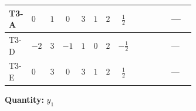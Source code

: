 \documentclass[8pt]{article}
\begin{document}
\begin{landscape}
\begin{longtable}{@{}llcccccc >{\raggedright\arraybackslash}p{0.21\linewidth} >{\raggedright\arraybackslash}p{0.21\linewidth} >{\raggedright\arraybackslash}p{0.21\linewidth}@{}}
\midrule
T3-A & $0$ & $1$ & $0$ & $3$ & $1$ & $2$ & $\frac{1}{2}$ & \scriptsize\adjustbox{max width=\linewidth}{$\begin{gathered} -\frac{9}{2} {g_2}^2 \left({y_1}\right)_{ij}\end{gathered}$} & \scriptsize\adjustbox{max width=\linewidth}{$\begin{gathered} -\frac{3}{2} {g_1}^2 \left({y_1}\right)_{ij}\end{gathered}$} & --- \\
\midrule
T3-D & $-2$ & $3$ & $-1$ & $1$ & $0$ & $2$ & $-\frac{1}{2}$ & \scriptsize\adjustbox{max width=\linewidth}{$\begin{gathered} -\frac{9}{2} {g_2}^2 \left({y_1}\right)_{ij}\end{gathered}$} & \scriptsize\adjustbox{max width=\linewidth}{$\begin{gathered} -\frac{3}{2} {g_1}^2 \left({y_1}\right)_{ij}\end{gathered}$} & --- \\
\midrule
T3-E & $0$ & $3$ & $0$ & $3$ & $1$ & $2$ & $\frac{1}{2}$ & \scriptsize\adjustbox{max width=\linewidth}{$\begin{gathered} -\frac{9}{2} {g_2}^2 \left({y_1}\right)_{ij}\end{gathered}$} & \scriptsize\adjustbox{max width=\linewidth}{$\begin{gathered} -\frac{3}{2} {g_1}^2 \left({y_1}\right)_{ij}\end{gathered}$} & --- \\
\midrule
\bottomrule
\end{longtable}
\clearpage
\noindent\textbf{Quantity: }$y_1$\par\smallskip

\end{landscape}
\end{document}
